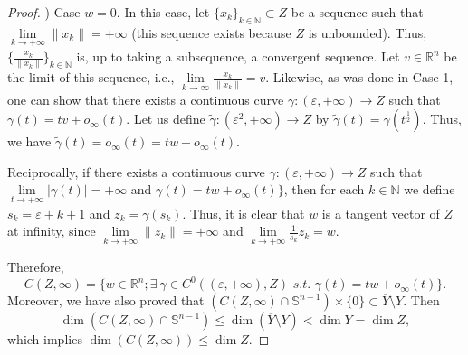 \documentclass[10pt,a4paper]{amsart}
\newcommand{\N}{\mathbb N}
\newcommand{\R}{\mathbb R}
\begin{document}
\begin{proof}
\bigskip

) Case $w=0$. In this case,  let $\{x_k\}_{k\in\N}\subset Z$ be a sequence such that  $\lim\limits _{k\to +\infty }\|x_k\|=+\infty $ (this sequence exists because $Z$ is unbounded). Thus, $\{\frac{x_k}{\|x_k\|}\}_{k\in\N}$ is, up to taking a subsequence, a convergent sequence. Let $v\in  \R^n$ be the limit of this sequence, i.e., $\lim\limits _{k\to \infty }\frac{x_k}{\|x_k\|}=v$. Likewise, as was done in Case 1, one can show that there exists a continuous curve $\gamma\colon (\varepsilon,+\infty )\to Z$ such that $\gamma(t)=tv+o_{\infty }(t)$. Let us define $\widetilde\gamma\colon (\varepsilon^{2}, +\infty )\to Z$ by $\widetilde{\gamma}(t)=\gamma(t^{\frac{1}{2}})$. Thus, we have $\widetilde{\gamma}(t)=o_{\infty }(t)=tw+o_{\infty }(t)$.

\bigskip

Reciprocally, if there exists a continuous curve $\gamma:(\varepsilon,+\infty )\to Z$ such that $\lim\limits _{t\to +\infty }|\gamma(t)|=+\infty$ and $\gamma(t)=tw+o_{\infty }(t)\}$, then for each $k\in \N$ we define $s_k=\varepsilon+k+1$ and $z_k=\gamma(s_k)$. Thus, it is clear that $w$ is a tangent vector of $Z$ at infinity, since $\lim\limits _{k\to +\infty }\|z_k\|=+\infty $ and $\lim\limits _{k\to +\infty }\frac{1}{s_k}z_k=w$.


Therefore, 
$$
C(Z,\infty)=\{w\in \R^n; \exists\ \gamma\in C^0((\varepsilon ,+\infty ), Z) \,\,  s.t.\,\,\gamma(t)=tw+o_{\infty }(t)\}.
$$ 
Moreover, we have also proved that $(C(Z,\infty)\cap \mathbb{S}^{n-1})\times \{0\}\subset \overline{Y}\setminus Y$. Then 
$$
\dim(C(Z,\infty)\cap \mathbb{S}^{n-1})\leq \dim(\overline{Y}\setminus Y)<\dim Y=\dim Z,
$$
which implies $\dim(C(Z,\infty))\leq \dim Z$.
\end{proof}
\end{document}
